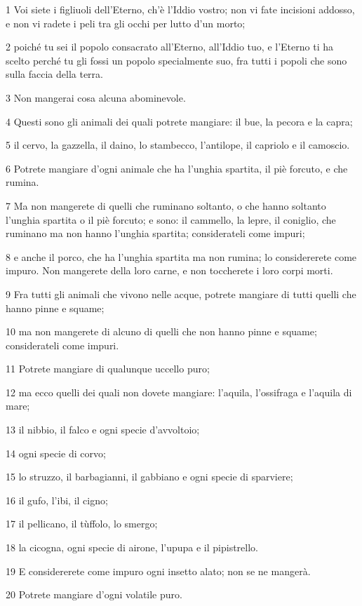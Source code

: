 \par 1 Voi siete i figliuoli dell'Eterno, ch'è l'Iddio vostro; non vi fate incisioni addosso, e non vi radete i peli tra gli occhi per lutto d'un morto;
\par 2 poiché tu sei il popolo consacrato all'Eterno, all'Iddio tuo, e l'Eterno ti ha scelto perché tu gli fossi un popolo specialmente suo, fra tutti i popoli che sono sulla faccia della terra.
\par 3 Non mangerai cosa alcuna abominevole.
\par 4 Questi sono gli animali dei quali potrete mangiare: il bue, la pecora e la capra;
\par 5 il cervo, la gazzella, il daino, lo stambecco, l'antilope, il capriolo e il camoscio.
\par 6 Potrete mangiare d'ogni animale che ha l'unghia spartita, il piè forcuto, e che rumina.
\par 7 Ma non mangerete di quelli che ruminano soltanto, o che hanno soltanto l'unghia spartita o il piè forcuto; e sono: il cammello, la lepre, il coniglio, che ruminano ma non hanno l'unghia spartita; considerateli come impuri;
\par 8 e anche il porco, che ha l'unghia spartita ma non rumina; lo considererete come impuro. Non mangerete della loro carne, e non toccherete i loro corpi morti.
\par 9 Fra tutti gli animali che vivono nelle acque, potrete mangiare di tutti quelli che hanno pinne e squame;
\par 10 ma non mangerete di alcuno di quelli che non hanno pinne e squame; considerateli come impuri.
\par 11 Potrete mangiare di qualunque uccello puro;
\par 12 ma ecco quelli dei quali non dovete mangiare: l'aquila, l'ossifraga e l'aquila di mare;
\par 13 il nibbio, il falco e ogni specie d'avvoltoio;
\par 14 ogni specie di corvo;
\par 15 lo struzzo, il barbagianni, il gabbiano e ogni specie di sparviere;
\par 16 il gufo, l'ibi, il cigno;
\par 17 il pellicano, il tùffolo, lo smergo;
\par 18 la cicogna, ogni specie di airone, l'upupa e il pipistrello.
\par 19 E considererete come impuro ogni insetto alato; non se ne mangerà.
\par 20 Potrete mangiare d'ogni volatile puro.
